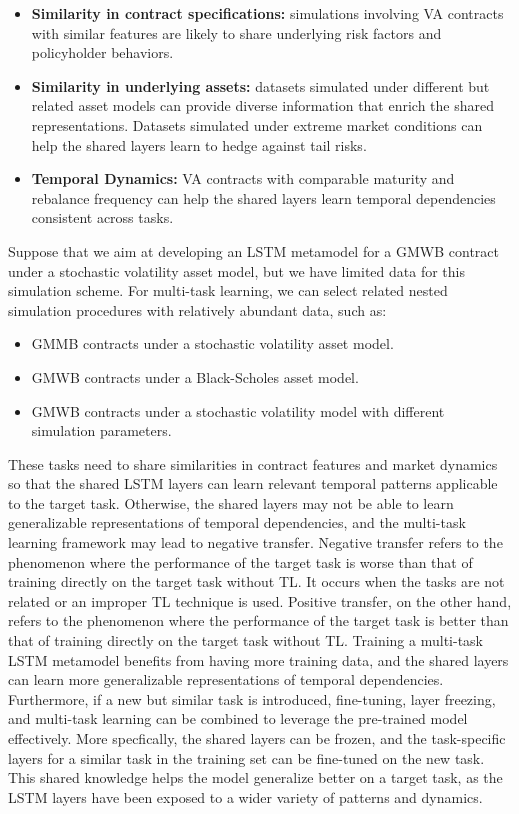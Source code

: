 \begin{itemize} 
    \item   \textbf{Similarity in contract specifications:} 
            simulations involving VA contracts with similar features are likely to share underlying risk factors and policyholder behaviors. 
    \item   \textbf{Similarity in underlying assets:} 
            datasets simulated under different but related asset models can provide diverse information that enrich the shared representations.
            Datasets simulated under extreme market conditions can help the shared layers learn to hedge against tail risks.
    \item   \textbf{Temporal Dynamics:} 
            VA contracts with comparable maturity and rebalance frequency can help the shared layers learn temporal dependencies consistent across tasks. 
\end{itemize}

Suppose that we aim at developing an LSTM metamodel for a GMWB contract under a stochastic volatility asset model, but we have limited data for this simulation scheme. 
For multi-task learning, we can select related nested simulation procedures with relatively abundant data, such as:


\begin{itemize} 
    \item GMMB contracts under a stochastic volatility asset model. 
    \item GMWB contracts under a Black-Scholes asset model. 
    \item GMWB contracts under a stochastic volatility model with different simulation parameters.
\end{itemize}

These tasks need to share similarities in contract features and market dynamics so that the shared LSTM layers can learn relevant temporal patterns applicable to the target task.
Otherwise, the shared layers may not be able to learn generalizable representations of temporal dependencies, and the multi-task learning framework may lead to negative transfer.
Negative transfer refers to the phenomenon where the performance of the target task is worse than that of training directly on the target task without TL.
It occurs when the tasks are not related or an improper TL technique is used.
Positive transfer, on the other hand, refers to the phenomenon where the performance of the target task is better than that of training directly on the target task without TL.
Training a multi-task LSTM metamodel benefits from having more training data, and the shared layers can learn more generalizable representations of temporal dependencies.
Furthermore, if a new but similar task is introduced, fine-tuning, layer freezing, and multi-task learning can be combined to leverage the pre-trained model effectively.
More specfically, the shared layers can be frozen, and the task-specific layers for a similar task in the training set can be fine-tuned on the new task.
This shared knowledge helps the model generalize better on a target task, as the LSTM layers have been exposed to a wider variety of patterns and dynamics.

